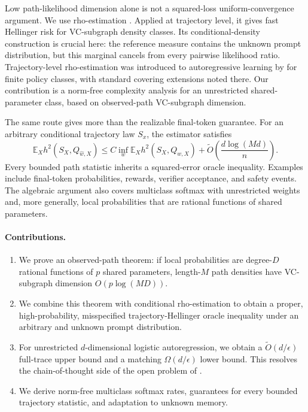 \documentclass{article}
\theoremstyle{definition}
\theoremstyle{remark}
\newcommand{\E}{\mathbb E}
\begin{document}
Low path-likelihood dimension alone is not a squared-loss uniform-convergence argument. We use rho-estimation \citep{baraud2018rho}. Applied at trajectory level, it gives fast Hellinger risk for VC-subgraph density classes. Its conditional-density construction is crucial here: the reference measure contains the unknown prompt distribution, but this marginal cancels from every pairwise likelihood ratio. Trajectory-level rho-estimation was introduced to autoregressive learning by \citet{rohatgi2025computational} for finite policy classes, with standard covering extensions noted there. Our contribution is a norm-free complexity analysis for an unrestricted shared-parameter class, based on observed-path VC-subgraph dimension.

The same route gives more than the realizable final-token guarantee. For an arbitrary conditional trajectory law $S_x$, the estimator satisfies \[ \E_X h^2(S_X,Q_{\widehat w,X}) \le C\inf_w\E_X h^2(S_X,Q_{w,X})+\widetilde O\!\left(\frac{d\log(Md)}{n}\right). \] Every bounded path statistic inherits a squared-error oracle inequality. Examples include final-token probabilities, rewards, verifier acceptance, and safety events. The algebraic argument also covers multiclass softmax with unrestricted weights and, more generally, local probabilities that are rational functions of shared parameters.

\paragraph{Contributions.}
\begin{enumerate}
\item We prove an observed-path theorem: if local probabilities are degree-$D$ rational functions of $p$ shared parameters, length-$M$ path densities have VC-subgraph dimension $O(p\log(MD))$.
\item We combine this theorem with conditional rho-estimation to obtain a proper, high-probability, misspecified trajectory-Hellinger oracle inequality under an arbitrary and unknown prompt distribution.
\item For unrestricted $d$-dimensional logistic autoregression, we obtain a $\widetilde O(d/\epsilon)$ full-trace upper bound and a matching $\Omega(d/\epsilon)$ lower bound. This resolves the chain-of-thought side of the open problem of \citet{doronarad2026stochastic}.
\item We derive norm-free multiclass softmax rates, guarantees for every bounded trajectory statistic, and adaptation to unknown memory.
\end{enumerate}
\end{document}
